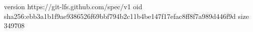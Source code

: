 version https://git-lfs.github.com/spec/v1
oid sha256:ebb3a1b1f9ae9386526f69bbf794b2c11b4be147f17efac8ff8f7a989d446f9d
size 349708
